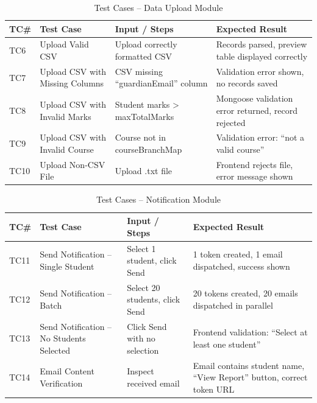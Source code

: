 \documentclass[12pt,a4paper]{report}
\begin{document}
\begin{table}[H]
\centering
\caption{Test Cases -- Data Upload Module}
\renewcommand{\arraystretch}{1.3}
\begin{tabular}{|p{0.8cm}|p{3cm}|p{4cm}|p{4.5cm}|}
\hline
\textbf{TC\#} & \textbf{Test Case} & \textbf{Input / Steps} & \textbf{Expected Result}\\
\hline
TC6 & Upload Valid CSV & Upload correctly formatted CSV & Records parsed, preview table displayed correctly\\
\hline
TC7 & Upload CSV with Missing Columns & CSV missing ``guardianEmail'' column & Validation error shown, no records saved\\
\hline
TC8 & Upload CSV with Invalid Marks & Student marks > maxTotalMarks & Mongoose validation error returned, record rejected\\
\hline
TC9 & Upload CSV with Invalid Course & Course not in courseBranchMap & Validation error: ``not a valid course''\\
\hline
TC10 & Upload Non-CSV File & Upload .txt file & Frontend rejects file, error message shown\\
\hline
\end{tabular}
\end{table}

\begin{table}[H]
\centering
\caption{Test Cases -- Notification Module}
\renewcommand{\arraystretch}{1.3}
\begin{tabular}{|p{0.8cm}|p{3cm}|p{4cm}|p{4.5cm}|}
\hline
\textbf{TC\#} & \textbf{Test Case} & \textbf{Input / Steps} & \textbf{Expected Result}\\
\hline
TC11 & Send Notification -- Single Student & Select 1 student, click Send & 1 token created, 1 email dispatched, success shown\\
\hline
TC12 & Send Notification -- Batch & Select 20 students, click Send & 20 tokens created, 20 emails dispatched in parallel\\
\hline
TC13 & Send Notification -- No Students Selected & Click Send with no selection & Frontend validation: ``Select at least one student''\\
\hline
TC14 & Email Content Verification & Inspect received email & Email contains student name, ``View Report'' button, correct token URL\\
\hline
\end{tabular}
\end{table}
\end{document}
